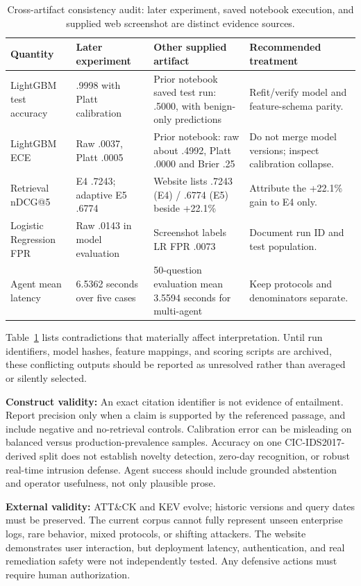 \documentclass[journal,twoside]{IEEEtran}
\begin{document}
\begin{table}[!t]
\caption{Cross-artifact consistency audit: later experiment, saved notebook execution, and supplied web screenshot are distinct evidence sources.}
\label{tab:reconcile}\centering\scriptsize
\setlength{\tabcolsep}{3pt}
\begin{tabular}{p{}p{}p{}p{}}
\toprule Quantity & Later experiment & Other supplied artifact & Recommended treatment\\\midrule
LightGBM test accuracy & .9998 with Platt calibration & Prior notebook saved test run: .5000, with benign-only predictions & Refit/verify model and feature-schema parity.\\
LightGBM ECE & Raw .0037, Platt .0005 & Prior notebook: raw about .4992, Platt .0000 and Brier .25 & Do not merge model versions; inspect calibration collapse.\\
Retrieval nDCG@5 & E4 .7243; adaptive E5 .6774 & Website lists .7243 (E4) / .6774 (E5) beside +22.1\% & Attribute the +22.1\% gain to E4 only.\\
Logistic Regression FPR & Raw .0143 in model evaluation & Screenshot labels LR FPR .0073 & Document run ID and test population.\\
Agent mean latency & 6.5362 seconds over five cases & 50-question evaluation mean 3.5594 seconds for multi-agent & Keep protocols and denominators separate.\\\bottomrule
\end{tabular}
\end{table}

Table~\ref{tab:reconcile} lists contradictions that materially affect interpretation. Until run identifiers, model hashes, feature mappings, and scoring scripts are archived, these conflicting outputs should be reported as unresolved rather than averaged or silently selected.


\textbf{Construct validity:} An exact citation identifier is not evidence of entailment. Report precision only when a claim is supported by the referenced passage, and include negative and no-retrieval controls. Calibration error can be misleading on balanced versus production-prevalence samples. Accuracy on one CIC-IDS2017-derived split does not establish novelty detection, zero-day recognition, or robust real-time intrusion defense. Agent success should include grounded abstention and operator usefulness, not only plausible prose.

\textbf{External validity:} ATT\&CK and KEV evolve; historic versions and query dates must be preserved. The current corpus cannot fully represent unseen enterprise logs, rare behavior, mixed protocols, or shifting attackers. The website demonstrates user interaction, but deployment latency, authentication, and real remediation safety were not independently tested. Any defensive actions must require human authorization.
\end{document}
